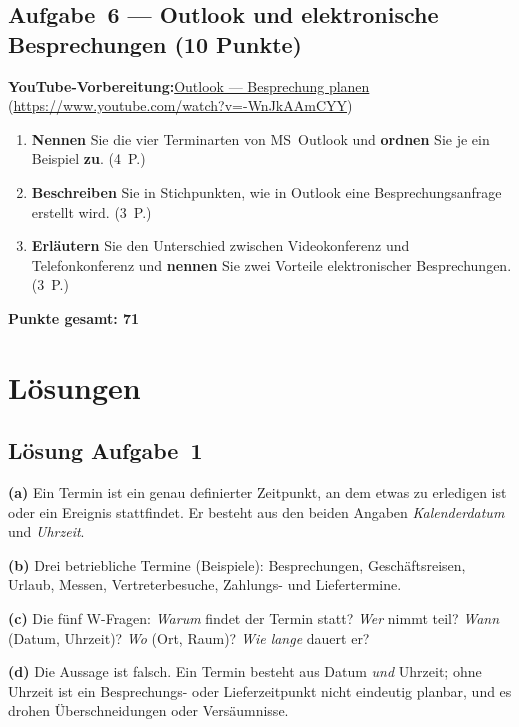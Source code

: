 \documentclass[11pt, a4paper]{article}
\begin{document}
\subsection*{Aufgabe~6 --- Outlook und elektronische Besprechungen (10 Punkte)}

\noindent\textbf{\color{bfwAccent}YouTube-Vorbereitung:}\enspace \href{https://www.youtube.com/watch?v=-WnJkAAmCYY}{Outlook --- Besprechung planen} (\url{https://www.youtube.com/watch?v=-WnJkAAmCYY})

\medskip
\begin{enumerate}[label=(\alph*)]
  \item \textbf{Nennen} Sie die vier Terminarten von MS~Outlook und \textbf{ordnen} Sie je ein Beispiel \textbf{zu}. \hfill (4~P.)
  \item \textbf{Beschreiben} Sie in Stichpunkten, wie in Outlook eine Besprechungsanfrage erstellt wird. \hfill (3~P.)
  \item \textbf{Erläutern} Sie den Unterschied zwischen Videokonferenz und Telefonkonferenz und \textbf{nennen} Sie zwei Vorteile elektronischer Besprechungen. \hfill (3~P.)
\end{enumerate}

\vspace{1em}
\noindent\textbf{Punkte gesamt: 71}

\newpage

\section{Lösungen}\label{loesungen}

\subsection*{Lösung Aufgabe~1}
\begin{loesung}
\textbf{(a)} Ein Termin ist ein genau definierter Zeitpunkt, an dem etwas zu erledigen
ist oder ein Ereignis stattfindet. Er besteht aus den beiden Angaben \emph{Kalenderdatum}
und \emph{Uhrzeit}.

\textbf{(b)} Drei betriebliche Termine (Beispiele): Besprechungen, Geschäftsreisen,
Urlaub, Messen, Vertreterbesuche, Zahlungs- und Liefertermine.

\textbf{(c)} Die fünf W-Fragen: \emph{Warum} findet der Termin statt? \emph{Wer} nimmt
teil? \emph{Wann} (Datum, Uhrzeit)? \emph{Wo} (Ort, Raum)? \emph{Wie lange} dauert er?

\textbf{(d)} Die Aussage ist falsch. Ein Termin besteht aus Datum \emph{und} Uhrzeit;
ohne Uhrzeit ist ein Besprechungs- oder Lieferzeitpunkt nicht eindeutig planbar, und es
drohen Überschneidungen oder Versäumnisse.
\end{loesung}
\end{document}

